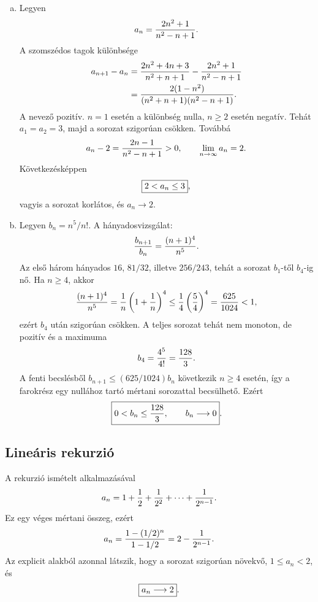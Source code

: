 \documentclass{szb-solution}
\begin{document}
\begin{enumerate}[a)]
  \item Legyen
        $$
          a_n=\frac{2n^2+1}{n^2-n+1}
          \text.
        $$
        A szomszédos tagok különbsége
        \begin{align*}
          a_{n+1}-a_n
          &=\frac{2n^2+4n+3}{n^2+n+1}
            -\frac{2n^2+1}{n^2-n+1}\\
          &=\frac{2(1-n^2)}{(n^2+n+1)(n^2-n+1)}
          \text.
        \end{align*}
        A nevező pozitív. $n=1$ esetén a különbség nulla, $n\geq2$ esetén
        negatív. Tehát $a_1=a_2=3$, majd a sorozat szigorúan csökken.
        Továbbá
        $$
          a_n-2=\frac{2n-1}{n^2-n+1}>0,
          \qquad
          \lim_{n\to\infty}a_n=2
          \text.
        $$
        Következésképpen
        $$
          \boxed{2<a_n\leq3}
          \text,
        $$
        vagyis a sorozat korlátos, és $a_n\to2$.

  \item Legyen $b_n=n^5/n!$. A hányadosvizsgálat:
        $$
          \frac{b_{n+1}}{b_n}
          =\frac{(n+1)^4}{n^5}
          \text.
        $$
        Az első három hányados $16$, $81/32$, illetve $256/243$, tehát a
        sorozat $b_1$-től $b_4$-ig nő. Ha $n\geq4$, akkor
        $$
          \frac{(n+1)^4}{n^5}
          =\frac1n\left(1+\frac1n\right)^4
          \leq\frac14\left(\frac54\right)^4
          =\frac{625}{1024}<1
          \text,
        $$
        ezért $b_4$ után szigorúan csökken. A teljes sorozat tehát nem
        monoton, de pozitív és a maximuma
        $$
          b_4=\frac{4^5}{4!}=\frac{128}{3}
          \text.
        $$
        A fenti becslésből $b_{n+1}\leq(625/1024)b_n$ következik $n\geq4$
        esetén, így a farokrész egy nullához tartó mértani sorozattal
        becsülhető. Ezért
        $$
          \boxed{0<b_n\leq\frac{128}{3},\qquad b_n\longrightarrow0}
          \text.
        $$
\end{enumerate}

\subsection{Lineáris rekurzió}

A rekurzió ismételt alkalmazásával
$$
  a_n=1+\frac12+\frac1{2^2}+\dots+\frac1{2^{n-1}}
  \text.
$$
Ez egy véges mértani összeg, ezért
$$
  a_n=\frac{1-(1/2)^n}{1-1/2}
  =2-\frac1{2^{n-1}}
  \text.
$$
Az explicit alakból azonnal látszik, hogy a sorozat szigorúan növekvő,
$1\leq a_n<2$, és
$$
  \boxed{a_n\longrightarrow2}
  \text.
$$
\end{document}
